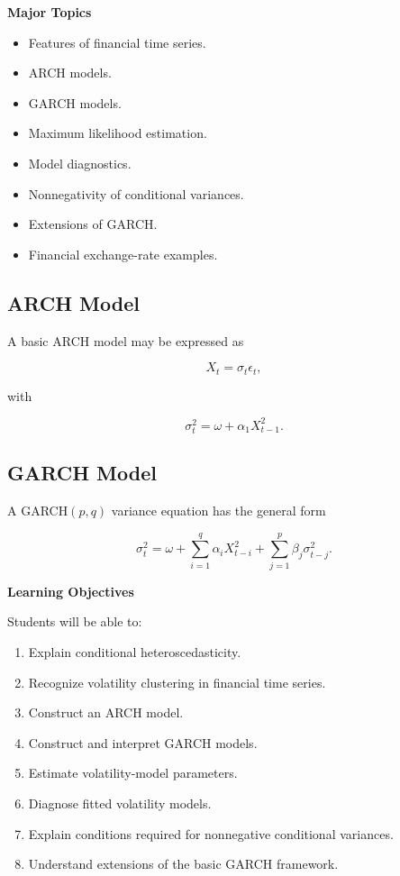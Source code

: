 \documentclass[11pt,a4paper]{article}
\begin{document}
\textbf{Major Topics}

\begin{itemize}
    \item Features of financial time series.
    \item ARCH models.
    \item GARCH models.
    \item Maximum likelihood estimation.
    \item Model diagnostics.
    \item Nonnegativity of conditional variances.
    \item Extensions of GARCH.
    \item Financial exchange-rate examples.
\end{itemize}

\subsection{ARCH Model}

A basic ARCH model may be expressed as

\[
X_t=\sigma_t\epsilon_t,
\]

with

\[
\sigma_t^2
=
\omega+
\alpha_1X_{t-1}^2.
\]

\subsection{GARCH Model}

A GARCH$(p,q)$ variance equation has the general form

\[
\sigma_t^2
=
\omega+
\sum_{i=1}^{q}\alpha_i X_{t-i}^2
+
\sum_{j=1}^{p}\beta_j\sigma_{t-j}^2.
\]

\textbf{Learning Objectives}

Students will be able to:

\begin{enumerate}
    \item Explain conditional heteroscedasticity.
    \item Recognize volatility clustering in financial time series.
    \item Construct an ARCH model.
    \item Construct and interpret GARCH models.
    \item Estimate volatility-model parameters.
    \item Diagnose fitted volatility models.
    \item Explain conditions required for nonnegative conditional variances.
    \item Understand extensions of the basic GARCH framework.
\end{enumerate}
\end{document}
